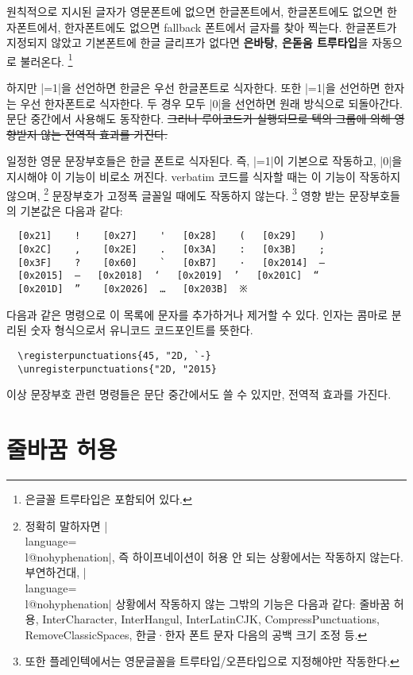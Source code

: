 \documentclass[a4paper]{article}
\def\luatex{\hologo{LuaTeX}}
\def\logoko{\textsf{k}\kern-.0625em\textit{o}}
\def\luatexko{\luatex-\logoko}
\def\texlive{\TeX\ Live}
\def\hemph#1{\textsf{\bfseries #1}}
\begin{document}
원칙적으로  지시된 글자가 영문폰트에 없으면 한글폰트에서,
한글폰트에도 없으면 한자폰트에서, 한자폰트에도 없으면 fallback
폰트에서 글자를 찾아 찍는다.
한글폰트가 지정되지 않았고 기본폰트에 한글 글리프가 없다면
\hemph{은바탕, 은돋움 트루타입}을 자동으로 불러온다.%
\footnote{%
  은글꼴 트루타입은  포함되어 있다. }

하지만 \pkgkwd{\hangulbyhangulfont}|=1|을 선언하면 한글은 우선 한글폰트로
식자한다. 또한 \pkgkwd{\hanjabyhanjafont}|=1|을 선언하면 한자는 우선 한자폰트로
식자한다. 두 경우 모두 |0|을 선언하면 원래 방식으로 되돌아간다.
문단 중간에서 사용해도 동작한다. \sout{그러나 루아코드가 실행되므로
텍의 그룹에 의해 영향받지 않는 전역적 효과를 가진다.}

일정한 영문 문장부호들은 한글 폰트로 식자된다.
즉, \pkgkwd{\hangulpunctuations}|=1|이 기본으로 작동하고,
|0|을 지시해야 이 기능이 비로소 꺼진다.
verbatim 코드를 식자할 때는 이 기능이 작동하지 않으며,%
\footnote{%
  정확히 말하자면 |\\language=\\l@nohyphenation|, 즉 하이프네이션이
  허용 안 되는  상황에서는 작동하지 않는다.
  부연하건대, |\\language=\\l@nohyphenation| 상황에서 작동하지 않는
  그밖의 기능은 다음과 같다: 줄바꿈 허용, InterCharacter, InterHangul,
  InterLatinCJK, CompressPunctuations, RemoveClassicSpaces,
  한글^^b7한자 폰트 문자 다음의 공백 크기 조정 등. }
문장부호가 고정폭 글꼴일 때에도 작동하지 않는다.%
\footnote{%
  또한 플레인텍에서는 영문글꼴을 트루타입/오픈타입으로 지정해야만 작동한다. }
영향 받는 문장부호들의 기본값은 다음과 같다:
\begin{verbatim}
  [0x21]    !    [0x27]    '   [0x28]    (   [0x29]    )
  [0x2C]    ,    [0x2E]    .   [0x3A]    :   [0x3B]    ;
  [0x3F]    ?    [0x60]    `   [0xB7]    ·   [0x2014]  —
  [0x2015]  ―   [0x2018]  ‘   [0x2019]  ’   [0x201C]  “
  [0x201D]  ”    [0x2026]  …   [0x203B]  ※
\end{verbatim}
다음과 같은 명령으로 이 목록에 문자를 추가하거나 제거할 수 있다.%
\pkgkwd*{\registerpunctuations}%
\pkgkwd*{\unregisterpunctuations}
인자는 콤마로 분리된 숫자 형식으로서 유니코드 코드포인트를 뜻한다.
\begin{verbatim}
  \registerpunctuations{45, "2D, `-}
  \unregisterpunctuations{"2D, "2015}
\end{verbatim}
이상 문장부호 관련 명령들은 문단 중간에서도 쓸 수 있지만, 전역적 효과를 가진다.

\section{줄바꿈 허용}\label{sec:break}
\end{document}
